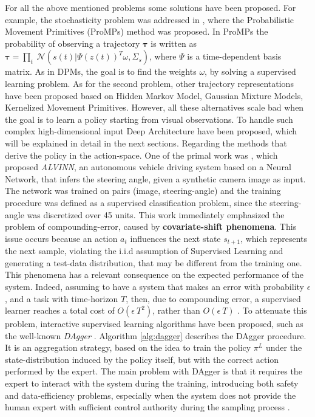 For all the above mentioned problems some solutions have been proposed. For example, the stochasticity problem was addressed in \cite{paraschos2013ProMPs}, where the Probabilistic Movement Primitives (ProMPs) method was proposed. In ProMPs the probability of observing a trajectory $\boldsymbol{\tau}$ is written as $\boldsymbol{\tau} = \underset{t}{\prod} \ \mathcal{N}(s(t)|\Psi(z(t))^{T}\omega, \Sigma_{s})$, where $\Psi$ is a time-dependent basis matrix. As in DPMs, the goal is to find the weights $\omega$, by solving a supervised learning problem. As for the second problem, other trajectory representations have been proposed based on Hidden Markov Model, Gaussian Mixture Models, Kernelized Movement Primitives. However, all these alternatives scale bad when the goal is to learn a policy starting from visual observations. To handle such complex high-dimensional input Deep Architecture have been proposed, which will be explained in detail in the next sections. 
\newline Regarding the methods that derive the policy in the action-space. One of the primal work was \cite{pomerleau1988alvinn}, which proposed \textit{ALVINN}, an autonomous vehicle driving system based on a Neural Network, that infers the steering angle, given a synthetic camera image as input. The network was trained on pairs (image, steering-angle) and the training procedure was defined as a supervised classification problem, since the steering-angle was discretized over 45 units. This work immediately emphasized the problem of compounding-error, caused by \textbf{covariate-shift phenomena}. This issue occurs because an action $a_{t}$ influences the next state $s_{t+1}$, which represents the next sample, violating the i.i.d assumption of Supervised Learning and generating a test-data distribution, that may be different from the training one. This phenomena has a relevant consequence on the expected performance of the system. Indeed, assuming to have a system that makes an error with probability $\epsilon$, and a task with time-horizon $T$, then, due to compounding error, a supervised learner reaches a total cost of $O(\epsilon \ T^{2})$, rather than $O(\epsilon \ T)$ \cite{ross2010efficient_reductions,ross2011dagger}. To attenuate this problem, interactive supervised learning algorithms have been proposed, such as the well-known \textit{DAgger} \cite{ross2011dagger}. Algorithm \ref{alg:dagger} describes the DAgger procedure. It is an aggregation strategy, based on the idea to train the policy $\pi^{L}$ under the state-distribution induced by the policy itself, but with the correct action performed by the expert. The main problem with DAgger is that it requires the expert to interact with the system during the training, introducing both safety and data-efficiency problems, especially when the system does not provide the human expert with sufficient control authority during the sampling process \cite{laskey2017comparing_hc_rc}. 
